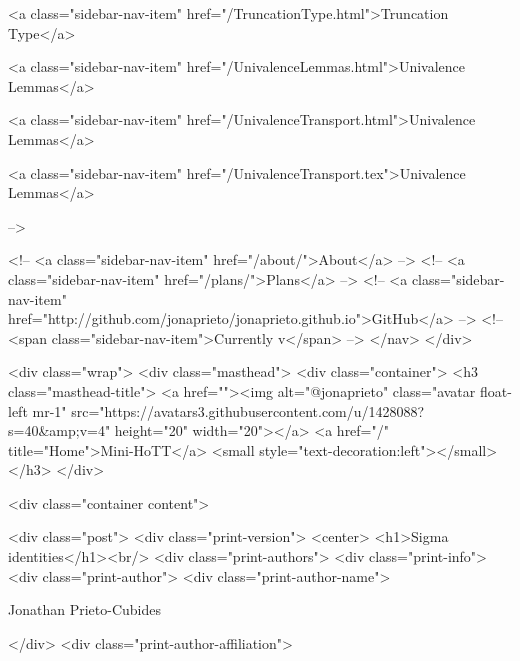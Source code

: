       
    
      
        
          <a class="sidebar-nav-item" href="/TruncationType.html">Truncation Type</a>
        
      
    
      
        
          <a class="sidebar-nav-item" href="/UnivalenceLemmas.html">Univalence Lemmas</a>
        
      
    
      
        
          <a class="sidebar-nav-item" href="/UnivalenceTransport.html">Univalence Lemmas</a>
        
      
    
      
        
          <a class="sidebar-nav-item" href="/UnivalenceTransport.tex">Univalence Lemmas</a>
        
      
     -->

    <!-- <a class="sidebar-nav-item" href="/about/">About</a> -->
    <!-- <a class="sidebar-nav-item" href="/plans/">Plans</a> -->
    <!-- <a class="sidebar-nav-item" href="http://github.com/jonaprieto/jonaprieto.github.io">GitHub</a> -->
    <!-- <span class="sidebar-nav-item">Currently v</span> -->
  </nav>
</div>

    <div class="wrap">
      <div class="masthead">
        <div class="container">
          <h3 class="masthead-title">
            <a href=""><img alt="@jonaprieto" class="avatar float-left mr-1" src="https://avatars3.githubusercontent.com/u/1428088?s=40&amp;v=4" height="20" width="20"></a>
            <a href="/" title="Home">Mini-HoTT</a>
            <small style="text-decoration:left"></small>
          </h3>
        </div>
      
      <div class="container content">
        







<div class="post">
  <div class="print-version">
    <center>
      <h1>Sigma identities</h1><br/>
        <div class="print-authors">
          <div class="print-info">
            <div class="print-author">
              <div class="print-author-name">
                
                  Jonathan Prieto-Cubides
                
              </div>
              <div class="print-author-affiliation">
                
